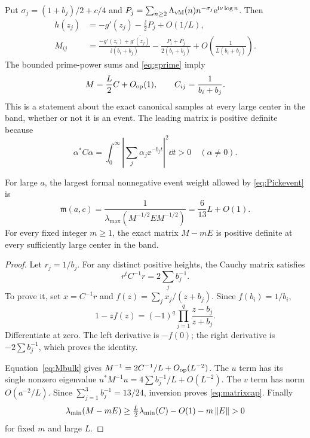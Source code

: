 Put \(\sigma_j=(1+b_j)/2+c/4\) and
\(P_j=\sum_{n\ge2}\Lambda_{\mathrm{vM}}(n)n^{-\sigma_j}\mathrm e^{\mathrm i\nu\log n}\).
Then
\begin{align}
 h(z_j)&=-g'(z_j)-\frac\ii2 P_j+O(1/L),\\
 M_{ij}&=\frac{-g'(z_i)+\overline{g'(z_j)}}{\ii(b_i+b_j)}
       -\frac{P_i+\overline{P_j}}{2(b_i+b_j)}
       +O\!\left(\frac1{L(b_i+b_j)}\right).
 \label{eq:signedM}
\end{align}
The bounded prime-power sums and \eqref{eq:gprime} imply
\begin{equation}\label{eq:Mbulk}
 M=\frac L2 C+O_{\mathrm{op}}(1),\qquad C_{ij}=\frac1{b_i+b_j}.
\end{equation}
This is a statement about the exact canonical samples at every large
center in the band, whether or not it is an event. The leading matrix
is positive definite because
\[
 \alpha^*C\alpha=\int_0^\infty
             \left|\sum_j\alpha_j\ee^{-b_jt}\right|^2\dd t>0
 \quad(\alpha\ne0).
\]

\begin{proposition}
\label{prop:matrixcap}
For large \(a\), the largest formal nonnegative event weight allowed by
\eqref{eq:Pickevent} is
\begin{equation}\label{eq:matrixcap}
 \mathfrak m(a,c)=
 \frac1{\lambda_{\max}(M^{-1/2}EM^{-1/2})}
 =\frac6{13}L+O(1).
\end{equation}
For every fixed integer \(m\ge1\), the exact matrix \(M-mE\) is positive
definite at every sufficiently large center in the band.
\end{proposition}
\begin{proof}
Let \(r_j=1/b_j\). For any distinct positive heights, the Cauchy matrix
satisfies
\begin{equation}\label{eq:Cauchyinverse}
 r^tC^{-1}r=2\sum_j b_j^{-1}.
\end{equation}
To prove it, set \(x=C^{-1}r\) and \(f(z)=\sum_jx_j/(z+b_j)\).
Since \(f(b_i)=1/b_i\),
\[
 1-zf(z)=(-1)^q\prod_{j=1}^q\frac{z-b_j}{z+b_j}.
\]
Differentiate at zero. The left derivative is \(-f(0)\); the right
derivative is \(-2\sum b_j^{-1}\), which proves the identity.

Equation~\eqref{eq:Mbulk} gives
\(M^{-1}=2C^{-1}/L+O_{\mathrm{op}}(L^{-2})\).
The \(u\) term has its single nonzero eigenvalue
\(u^*M^{-1}u=4\sum b_j^{-1}/L+O(L^{-2})\).
The \(v\) term has norm \(O(a^{-2}/L)\). Since
\(\sum_{j=1}^3b_j^{-1}=13/24\), inversion proves
\eqref{eq:matrixcap}. Finally
\[
 \lambda_{\min}(M-mE)
 \ge \tfrac L2\lambda_{\min}(C)-O(1)-m\left\lVert E\right\rVert>0
\]
for fixed \(m\) and large \(L\).
\end{proof}


